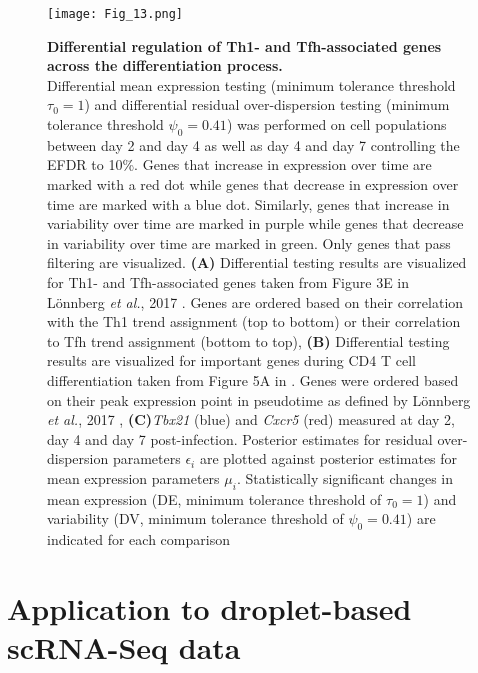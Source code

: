 \begin{figure}[!h]
  \begin{minipage}[c]{0.57\textwidth}
    \texttt{[image: Fig\_13.png]}
  \end{minipage}\hfill
  \begin{minipage}[c]{0.4\textwidth}
\caption[Differential regulation of lineage-associated genes across differentiation]{\textbf{Differential regulation of Th1- and Tfh-associated genes across the differentiation process.}\\
Differential mean expression testing (minimum tolerance threshold $\tau_0=1$) and differential residual over-dispersion testing (minimum tolerance threshold $\psi_0=0.41$) was performed on cell populations between day 2 and day 4 as well as day 4 and day 7 controlling the EFDR to 10\%. Genes that increase in expression over time are marked with a red dot while genes that decrease in expression over time are marked with a blue dot. Similarly, genes that increase in variability over time are marked in purple while genes that decrease in variability over time are marked in green. Only genes that pass filtering are visualized. \textbf{(A)} Differential testing results are visualized for Th1- and Tfh-associated genes taken from Figure 3E in L\"onnberg \emph{et al.}, 2017 \citep{Lonnberg2017}. Genes are ordered based on their correlation with the Th1 trend assignment (top to bottom) or their correlation to Tfh trend assignment (bottom to top), \textbf{(B)} Differential testing results are visualized for important genes during CD4\plus{} T cell differentiation taken from Figure 5A in \citep{Lonnberg2017}. Genes were ordered based on their peak expression point in pseudotime as defined by L\"onnberg \emph{et al.}, 2017 \citep{Lonnberg2017}, \textbf{(C)}\textit{Tbx21} (blue) and \textit{Cxcr5} (red) measured at day 2, day 4 and day 7 post-infection. Posterior estimates for residual over-dispersion parameters $\epsilon_i$ are plotted against posterior estimates for mean expression parameters $\mu_i$. Statistically significant changes in mean expression (DE, minimum tolerance threshold of $\tau_0=1$) and variability (DV, minimum tolerance threshold of $\psi_0=0.41$) are indicated for each comparison} \label{fig2:immune_differentiation2}
  \end{minipage}
\end{figure}

\newpage

\section{Application to droplet-based scRNA-Seq data}
\label{sec2:droplet}

